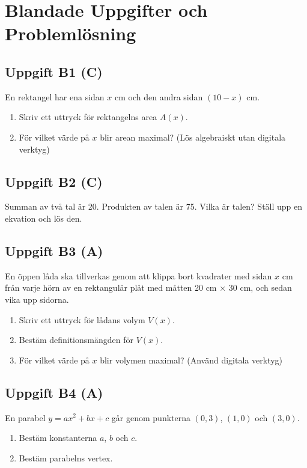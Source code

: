 \documentclass[12pt]{article}
\begin{document}
\newpage

\section{Blandade Uppgifter och Problemlösning}

\subsection*{Uppgift B1 (C)}
En rektangel har ena sidan $x$ cm och den andra sidan $(10 - x)$ cm.
\begin{enumerate}[label=\alph*)]
    \item Skriv ett uttryck för rektangelns area $A(x)$.
    \item För vilket värde på $x$ blir arean maximal? (Lös algebraiskt utan digitala verktyg)
\end{enumerate}

\subsection*{Uppgift B2 (C)}
Summan av två tal är 20. Produkten av talen är 75. Vilka är talen? Ställ upp en ekvation och lös den.

\subsection*{Uppgift B3 (A)}
En öppen låda ska tillverkas genom att klippa bort kvadrater med sidan $x$ cm från varje hörn av en rektangulär plåt med måtten 20 cm × 30 cm, och sedan vika upp sidorna.
\begin{enumerate}[label=\alph*)]
    \item Skriv ett uttryck för lådans volym $V(x)$.
    \item Bestäm definitionsmängden för $V(x)$.
    \item För vilket värde på $x$ blir volymen maximal? (Använd digitala verktyg)
\end{enumerate}

\subsection*{Uppgift B4 (A)}
En parabel $y = ax^2 + bx + c$ går genom punkterna $(0, 3)$, $(1, 0)$ och $(3, 0)$.
\begin{enumerate}[label=\alph*)]
    \item Bestäm konstanterna $a$, $b$ och $c$.
    \item Bestäm parabelns vertex.
\end{enumerate}
\end{document}
